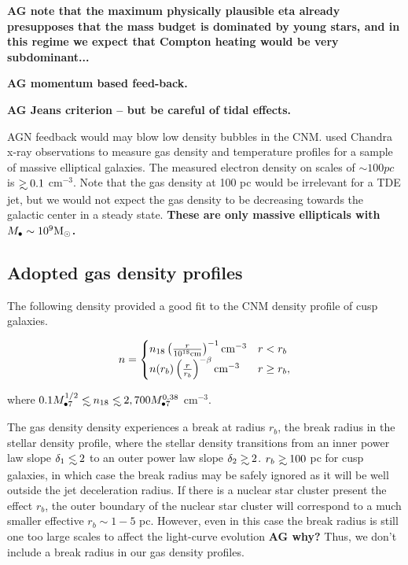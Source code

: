 \documentclass[usenatbib,fleqn]{mn2e}
\newcommand\lsim{\mathrel{\rlap{\lower4pt\hbox{\hskip1pt$\sim$}}
    \raise1pt\hbox{$<$}}}
\newcommand\gsim{\mathrel{\rlap{\lower4pt\hbox{\hskip1pt$\sim$}}
    \raise1pt\hbox{$>$}}}
\newcommand{\Mbh}[1][]{M_{\bullet#1}}
\newcommand{\Msun}{{\rm M_\odot}}
\begin{document}
{\bf AG note that the maximum physically plausible eta already
  presupposes that the mass budget is dominated by young stars, and in
this regime we expect that Compton heating would be very
subdominant...}

{\bf AG momentum based feed-back.}


{\bf AG Jeans criterion -- but be careful of tidal effects.}

AGN feedback would may blow low density bubbles in the
CNM. \citet{Russell+2013} used Chandra x-ray observations to measure gas
density and temperature profiles for a sample of massive elliptical
galaxies. The measured electron density on scales of $\sim 100
pc$ is $\gsim 0.1$ cm$^{-3}$. Note that the gas density at 100 pc
would be irrelevant for a TDE jet, but we would not expect the gas
density to be decreasing towards the galactic center in a steady
state. {\bf These are only massive ellipticals with $\Mbh\sim 10^{9} \Msun$.}

\subsection{Adopted gas density profiles}
 The following density provided a good fit to the CNM density profile
 of cusp galaxies.

\begin{align}
n=
\begin{cases}
  n_{18} \left(\frac{r}{10^{18} {\rm cm}}\right)^{-1} {\rm cm^{-3}} & r<r_b \\
  n(r_b) \left(\frac{r}{r_b}\right)^{-\beta} {\rm cm^{-3}} & r\geq
  r_b,\\
  \label{eq:profile}
\end{cases}
\end{align}

where $0.1 \Mbh[7]^{1/2} \lsim n_{\rm 18}\lsim 2,700
\Mbh[7]^{0.38} $ cm$^{-3}$.  

The gas density density experiences a break at radius $r_b$, the break
radius in the stellar density profile, where the stellar density
transitions from an inner power law slope $\delta_1\lsim 2$ to an outer
power law slope $\delta_2\gsim 2$. $r_b\gsim 100$ pc for cusp galaxies,
in which case the break radius may be safely ignored as it will be
well outside the jet deceleration radius. If there is a nuclear
star cluster present the effect $r_b$, the outer boundary of the
nuclear star cluster will correspond to a much smaller effective
$r_b\sim 1-5$ pc. However, even in this case the break radius is still
one too large scales to affect the light-curve evolution {\bf AG why?}
Thus, we don't include a break radius in our gas density profiles.
\end{document}

